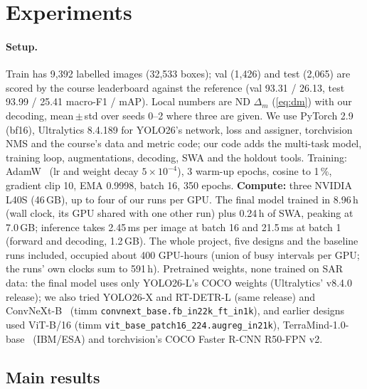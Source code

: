 \section{Experiments}
\label{sec:experiments}

\paragraph{Setup.}
Train has 9{,}392 labelled images (32{,}533 boxes); val (1{,}426) and test (2{,}065) are scored by the course
leaderboard against the reference (val 93.31 / 26.13, test 93.99 / 25.41 macro-F1 / mAP).
Local numbers are ND $\Delta_m$ (\cref{eq:dm}) with our decoding, mean\,$\pm$\,std over seeds 0--2 where three are
given.
We use PyTorch 2.9 (bf16), Ultralytics 8.4.189 for YOLO26's network, loss and assigner, torchvision NMS and the
course's data and metric code; our code adds the multi-task model, training loop, augmentations, decoding, SWA and the
holdout tools.
Training: AdamW~\cite{loshchilov2019adamw} (lr and weight decay $5{\times}10^{-4}$), 3 warm-up epochs, cosine to
1\,\%, gradient clip 10, EMA 0.9998, batch 16, 350 epochs.
\textbf{Compute:} three NVIDIA L40S (46\,GB), up to four of our runs per GPU.
The final model trained in 8.96\,h (wall clock, its GPU shared with one other run) plus 0.24\,h of SWA, peaking at
7.0\,GB; inference takes 2.45\,ms per image at batch 16 and 21.5\,ms at batch 1 (forward and decoding, 1.2\,GB).
The whole project, five designs and the baseline runs included, occupied about 400 GPU-hours (union of busy intervals
per GPU; the runs' own clocks sum to 591\,h).
Pretrained weights, none trained on SAR data: the final model uses only YOLO26-L's COCO weights (Ultralytics' v8.4.0
release); we also tried YOLO26-X and RT-DETR-L (same release) and ConvNeXt-B~\cite{liu2022convnext} (timm
\nolinkurl{convnext_base.fb_in22k_ft_in1k}), and earlier designs used ViT-B/16 (timm
\nolinkurl{vit_base_patch16_224.augreg_in21k}), TerraMind-1.0-base~\cite{jakubik2025terramind} (IBM/ESA) and
torchvision's COCO Faster R-CNN R50-FPN v2.

\subsection{Main results}
\label{sec:main}

